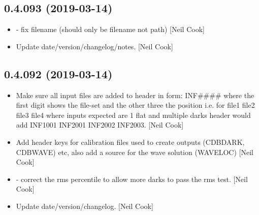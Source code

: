 \documentclass[a4paper,10pt,english]{report}
\begin{document}
\subsection{0.4.093 (2019-03-14)}
\label{\detokenize{misc/changelog:id166}}\begin{itemize}
\item {} 
 - fix filename (should only be filename not
path) {[}Neil Cook{]}

\item {} 
Update date/version/changelog/notes. {[}Neil Cook{]}

\end{itemize}


\subsection{0.4.092 (2019-03-14)}
\label{\detokenize{misc/changelog:id167}}\begin{itemize}
\item {} 
Make sure all input files are added to header in form: INF\#\#\#\# where
the first digit shows the file-set and the other three the position
i.e. for   file1 file2 file3 file4   where inputs
expected are 1 flat and multiple darks header would add INF1001
INF2001 INF2002 INF2003. {[}Neil Cook{]}

\item {} 
Add header keys for calibration files used to create outputs (CDBDARK,
CDBWAVE) etc, also add a source for the wave solution (WAVELOC) {[}Neil
Cook{]}

\item {} 
 - correct the rms percentile to allow more darks to
pass the rms test. {[}Neil Cook{]}

\item {} 
Update date/version/changelog. {[}Neil Cook{]}

\end{itemize}
\end{document}
